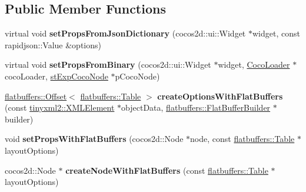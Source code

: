\subsection*{Public Member Functions}
\begin{DoxyCompactItemize}
\item 
\mbox{\label{classcocostudio_1_1LayoutReader_a69997a7d069cd35f892dca0b2c106134}} 
virtual void {\bfseries set\+Props\+From\+Json\+Dictionary} (cocos2d\+::ui\+::\+Widget $\ast$widget, const rapidjson\+::\+Value \&options)
\item 
\mbox{\label{classcocostudio_1_1LayoutReader_a0c9fecb2dd8f89fed8686c400d4b0fb8}} 
virtual void {\bfseries set\+Props\+From\+Binary} (cocos2d\+::ui\+::\+Widget $\ast$widget, \hyperlink{classcocostudio_1_1CocoLoader}{Coco\+Loader} $\ast$coco\+Loader, \hyperlink{structcocostudio_1_1stExpCocoNode}{st\+Exp\+Coco\+Node} $\ast$p\+Coco\+Node)
\item 
\mbox{\label{classcocostudio_1_1LayoutReader_a41e0036da06aba18ebac0f2ec01e7ece}} 
\hyperlink{structflatbuffers_1_1Offset}{flatbuffers\+::\+Offset}$<$ \hyperlink{classflatbuffers_1_1Table}{flatbuffers\+::\+Table} $>$ {\bfseries create\+Options\+With\+Flat\+Buffers} (const \hyperlink{classtinyxml2_1_1XMLElement}{tinyxml2\+::\+X\+M\+L\+Element} $\ast$object\+Data, \hyperlink{classflatbuffers_1_1FlatBufferBuilder}{flatbuffers\+::\+Flat\+Buffer\+Builder} $\ast$builder)
\item 
\mbox{\label{classcocostudio_1_1LayoutReader_ae749b1054db96b2e9298c0a1420d7d90}} 
void {\bfseries set\+Props\+With\+Flat\+Buffers} (cocos2d\+::\+Node $\ast$node, const \hyperlink{classflatbuffers_1_1Table}{flatbuffers\+::\+Table} $\ast$layout\+Options)
\item 
\mbox{\label{classcocostudio_1_1LayoutReader_a2617de905264222c6f481827cd096570}} 
cocos2d\+::\+Node $\ast$ {\bfseries create\+Node\+With\+Flat\+Buffers} (const \hyperlink{classflatbuffers_1_1Table}{flatbuffers\+::\+Table} $\ast$layout\+Options)
\item 
\mbox{\label{classcocostudio_1_1LayoutReader_a4ec61008f0d631ad48ae9a34934f44fb}} 

\end{DoxyCompactItemize}
